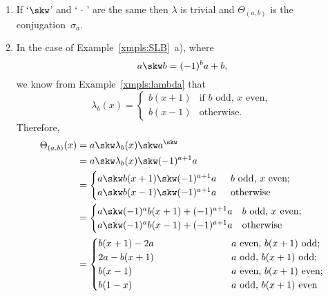\begin{xmpls}\label{xmpls:Theta}${}$
    \begin{enumerate}[\rm a)]
        \item If `$\skw$' and `$\,\cdot\,$' are the same then $\lambda$ is trivial and $\Theta_{(a,b)}$ is the conjugation~$\sigma_a$.

        \item In the case of Example~\ref{xmpls:SLB}~a), where
        $$
            a\skw b = (-1)^ba + b,
        $$
        we know from Example~\ref{xmpls:lambda} that
        $$
            \lambda_b(x) = \begin{cases}
                    b(x+1) &\text{if $b$ odd, $x$ even},\\
                    b(x-1) &\text{otherwise}.
                \end{cases}
        $$
        Therefore,
        \begin{align*}
            \Theta_{(a,b)}(x) &= a\skw\lambda_b(x)\skw a^\skw\\
                &= a\skw\lambda_b(x)\skw(-1)^{a+1}a\\
                &= \begin{cases}
                    \mathrlap{a\skw b(x+1)\skw(-1)^{a+1}a}
                    \hphantom{-------------}
                        &b\text{ odd, }x\text{ even};\\
                    a\skw b(x-1)\skw(-1)^{a+1}a
                        &\text{otherwise}
                \end{cases}\\
                &= \begin{cases}
                    \mathrlap{a\skw(-1)^ab(x+1) + (-1)^{a+1}a}
                    \hphantom{-------------}
                        &b\text{ odd, }x\text{ even};\\
                    a\skw(-1)^ab(x-1) + (-1)^{a+1}a
                        &\text{otherwise}
                \end{cases}\\
                &= \begin{cases}
                    \mathrlap{b(x+1) - 2a}
                    \hphantom{-------------}
                        &\text{$a$ even, $b(x+1)$ odd;}\\
                    2a - b(x+1)
                        &\text{$a$ odd, $b(x+1)$ odd;}\\
                    b(x-1)
                        &\text{$a$ even, $b(x+1)$ even;}\\
                    b(1-x)
                        &\text{$a$ odd, $b(x+1)$ even}
                \end{cases}
        \end{align*}


\end{enumerate}
\end{xmpls}
